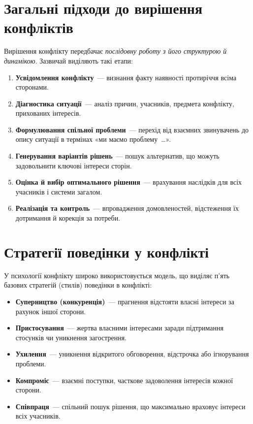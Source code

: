 \documentclass[12pt,a4paper]{article}
\begin{document}
    \section*{Загальні підходи до вирішення конфліктів}
    Вирішення конфлікту передбачає \textit{послідовну роботу з його структурою й динамікою}. 
    Зазвичай виділяють такі етапи:
    \begin{enumerate}
        \item \textbf{Усвідомлення конфлікту}~--- визнання факту наявності протиріччя всіма сторонами.
        \item \textbf{Діагностика ситуації}~--- аналіз причин, учасників, предмета конфлікту, прихованих інтересів.
        \item \textbf{Формулювання спільної проблеми}~--- перехід від взаємних звинувачень до опису ситуації в термінах «ми маємо проблему~\ldots».
        \item \textbf{Генерування варіантів рішень}~--- пошук альтернатив, що можуть задовольнити ключові інтереси сторін.
        \item \textbf{Оцінка й вибір оптимального рішення}~--- врахування наслідків для всіх учасників і системи загалом.
        \item \textbf{Реалізація та контроль}~--- впровадження домовленостей, відстеження їх дотримання й корекція за потреби.
    \end{enumerate}

    \section*{Стратегії поведінки у конфлікті}
    У психології конфлікту широко використовується модель, 
    що виділяє п’ять базових стратегій (стилів) поведінки в конфлікті:
    \begin{itemize}
        \item \textbf{Суперництво (конкуренція)}~--- прагнення відстояти власні інтереси за рахунок іншої сторони.
        \item \textbf{Пристосування}~--- жертва власними інтересами заради підтримання стосунків чи уникнення загострення.
        \item \textbf{Ухилення}~--- уникнення відкритого обговорення, відстрочка або ігнорування проблеми.
        \item \textbf{Компроміс}~--- взаємні поступки, часткове задоволення інтересів кожної сторони.
        \item \textbf{Співпраця}~--- спільний пошук рішення, що максимально враховує інтереси всіх учасників.
    \end{itemize}
\end{document}
